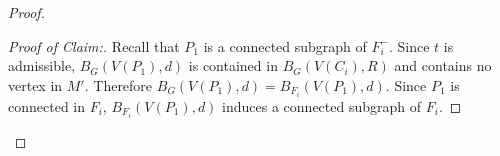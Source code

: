 \documentclass{patmorin}
\newcommand{\pat}[1]{\textcolor{Blue}{Pat: #1}}
\newcommand{\piotr}[1]{\textcolor{red}{Piotr: #1}}
\newenvironment{clmproof}{\begin{proof}[Proof of Claim:]\renewcommand{\qedsymbol}{\rule{1ex}{1ex}}}{\end{proof}}
\DeclareMathOperator{\dist}{dist}
\begin{document}
\begin{proof}
\begin{clmproof}
    Recall that $P_1$ is a connected
    subgraph of $F_i^-$.  Since $t$ is admissible, $B_G(V(P_1),d)$ is contained in $B_G(V(C_i),R)$ and contains no vertex in $M'$.  Therefore $B_G(V(P_1),d)=B_{F_i}(V(P_1),d)$. 
    Since $P_1$ is connected in $F_i$, 
    $B_{F_i}(V(P_1),d)$ induces a connected subgraph of $F_i$. 
\end{clmproof}

%
%

\begin{comment}
\begin{clm}\label{w_distance}
  Let $t_1$ and $t_2$ be admissible tuples with 
  $\dist_G(V(W_{t_1}),V(W_{t_2}))\le d$.  
  Then $\Psi_i(t_1)\cap \Psi_i(t_2)\neq\emptyset$ for some $i\in\{0,\ldots,p\}$.
  \piotr{maybe contraposition because of application.}
\end{clm}
\end{comment}


\end{proof}
\end{document}
